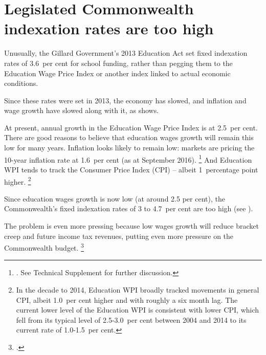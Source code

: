 \documentclass{grattan}
\begin{document}
\section{Legislated Commonwealth indexation rates are too high }\label{sec:legislated-commonwealth-indexation-rates-are-too-high}

Unusually, the Gillard Government's 2013 Education Act set fixed indexation rates of 3.6~per cent for school funding, rather than pegging them to the Education Wage Price Index or another index linked to actual economic conditions.

Since these rates were set in 2013, the economy has slowed, and inflation and wage growth have slowed along with it, as  shows.

At present, annual growth in the Education Wage Price Index is at 2.5~per cent.
There are good reasons to believe that education wages growth will remain this low for many years.
Inflation looks likely to remain low: markets are pricing the 10-year inflation rate at 1.6~per cent (as at September 2016).%
\footnote{\textcite{RBA2016G3InflationExpectations}.
See Technical Supplement for further discussion.} %
And Education WPI tends to track the Consumer Price Index (CPI) -- albeit 1~percentage point higher.%
\footnote{In the decade to 2014, Education WPI broadly tracked movements in general CPI, albeit 1.0~per cent higher and with roughly a six month lag. The current lower level of the Education WPI is consistent with lower CPI, which fell from its typical level of 2.5-3.0~per cent between 2004 and 2014 to its current rate of 1.0-1.5~per cent.}

Since education wages growth is now low (at around 2.5 per cent), the Commonwealth's fixed indexation rates of 3 to 4.7~per cent are too high (see ).

The problem is even more pressing because low wages growth will reduce bracket creep and future income tax revenues, putting even more pressure on the Commonwealth budget.%
\footnote{\textcite{DaleyWood2015FiscalChallenges} .}
\end{document}
